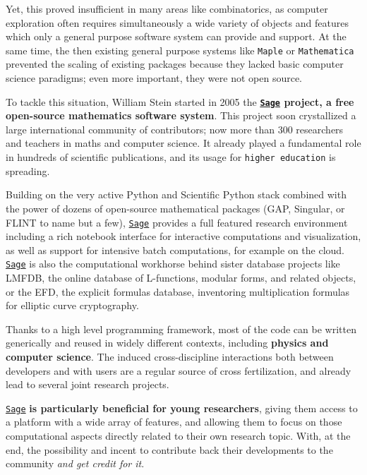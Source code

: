 \documentclass[a4,12pt]{amsart}
\newcommand{\sage}{\href{http://www.sagemath.org/}{\texttt{Sage}}\xspace}
\begin{document}
Yet, this proved insufficient in many areas like combinatorics, as
computer exploration often requires simultaneously a wide variety of
objects and features which only a general purpose software system can
provide and support. At the same time, the then existing general
purpose systems like \texttt{Maple} or \texttt{Mathematica} prevented
the scaling of existing packages because they lacked basic computer
science paradigms; even more important, they were not open source.


To tackle this situation, William Stein started in 2005 the \textbf{\sage{}
project, a free open-source mathematics software system}. This project
soon crystallized a large international community of contributors; now
more than 300 researchers and teachers in maths and computer
science. It already played a fundamental role in hundreds of
scientific publications, and its usage for \texttt{higher education}
is spreading.

Building on the very active Python and Scientific Python stack
combined with the power of dozens of open-source mathematical packages
(GAP, Singular, or FLINT to name but a few), \sage{} provides a full
featured research environment including a rich notebook interface for
interactive computations and visualization, as well as support for
intensive batch computations, for example on the cloud. \sage{} is also
the computational workhorse behind sister database projects like
\textsc{LMFDB}, the online database of L-functions, modular forms, and
related objects, or the \textsc{EFD}, the explicit formulas database,
inventoring multiplication formulas for elliptic curve cryptography.

Thanks to a high level programming framework, most of the code can be
written generically and reused in widely different contexts, including
\textbf{physics and computer science}. The induced cross-discipline
interactions both between developers and with users
are a regular source of cross fertilization, and already lead to
several joint research projects.

\sage{} \textbf{is particularly beneficial for young researchers},
giving them access to a platform with a wide array of features, and
allowing them to focus on those computational aspects directly related
to their own research topic. With, at the end, the possibility and
incent to contribute back their developments to the community
\emph{and get credit for it}.
\end{document}
